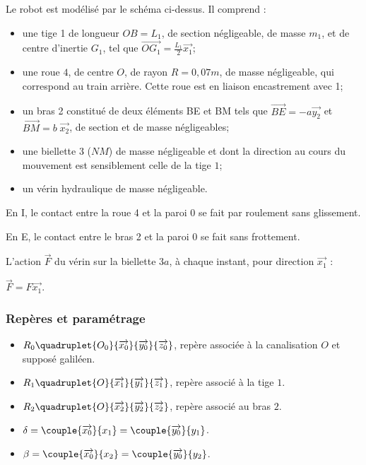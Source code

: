 \begin{multicols}{2}
Le robot est modélisé par le schéma ci-dessus. Il comprend :
\begin{itemize}
\item une tige 1 de longueur $OB=L_1$, de section négligeable, de masse $m_1$, et de centre d'inertie $G_1$, tel que $\overrightarrow{OG_1}=\frac{L_1}{2}\overrightarrow{x_1}$;
\item une roue $4$, de centre $O$, de rayon $R = 0,07 m$, de masse négligeable, qui
correspond au train arrière. Cette roue est en liaison encastrement avec 1;
\item un bras 2 constitué de deux éléments BE et BM tels que $\overrightarrow{BE}=-a\overrightarrow{y_2}$ et $\overrightarrow{BM}=b\;\overrightarrow{x_2}$, de section et de masse négligeables;
\item une biellette 3 ($NM$) de masse négligeable et dont la direction au cours
du mouvement est sensiblement celle de la tige $1$;
\item un vérin hydraulique de masse négligeable.
\end{itemize}

 En I, le contact entre la roue 4 et la paroi 0 se fait par roulement sans glissement.

 En E, le contact entre le bras 2 et la paroi 0 se fait sans frottement.

 L'action $\overrightarrow{F}$ du vérin sur la biellette $3a$, à chaque instant, pour direction $\overrightarrow{x_1}$ :

$\overrightarrow{F} = F \overrightarrow{x_1}.$


\subsubsection*{Repères et paramétrage}
\begin{itemize}
\item $R_0\quadruplet{O_0}{\overrightarrow{x_0}}{\overrightarrow{y_0}}{\overrightarrow{z_0}}$, repère associée à la canalisation $O$ et supposé galiléen.
\item $R_1\quadruplet{O}{\overrightarrow{x_1}}{\overrightarrow{y_1}}{\overrightarrow{z_1}}$, repère associé à la tige $1$.
\item $R_2\quadruplet{O}{\overrightarrow{x_2}}{\overrightarrow{y_2}}{\overrightarrow{z_2}}$, repère associé au bras $2$.
\item $\delta=\couple{\overrightarrow{x_0}}{{x_1}}=\couple{\overrightarrow{y_0}}{{y_1}}$.
\item $\beta=\couple{\overrightarrow{x_0}}{{x_2}}=\couple{\overrightarrow{y_0}}{{y_2}}$.
\end{itemize}


\end{multicols}
